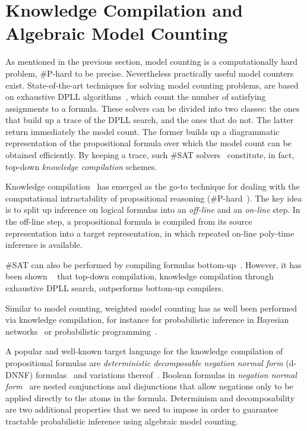 



\section{Knowledge Compilation and Algebraic Model Counting} \label{app:compilation}

As mentioned in the previous section, model counting is a computationally hard problem, \#P-hard to be precise. Nevertheless practically useful model counters exist. State-of-the-art techniques for solving model counting problems, are based on exhaustive DPLL algorithms~\citep{birnbaum1999good}, which count the number of satisfying assignments to a formula. These solvers can be divided into two classes: the ones that build up a trace of the DPLL search, and the ones that do not. The latter return immediately the model count. The former builds up a diagrammatic representation of the propositional formula over which the model count can be obtained efficiently. By keeping a trace, such \#SAT solvers~\citep{huang2005dpll,oztok2018exhaustive} constitute, in fact, top-down {\em knowledge compilation} schemes.

Knowledge compilation~\citep{darwiche2002knowledge} has emerged as the go-to technique for dealing with the computational intractability of propositional reasoning (\#P-hard~\citep{valiant1979complexity}). The key idea is to split up inference on logical formulas into an \textit{off-line} and an \textit{on-line} step. In the off-line step, a propositional formula is compiled from its source representation into a target representation, in which repeated on-line poly-time inference is available.

\#SAT can also be performed by compiling formulas bottom-up~\citep{choi2013dynamic}. However, it has been shown ~\citep{huang2005dpll,oztok2018exhaustive} that top-down compilation, \ie knowledge compilation through exhaustive DPLL search, outperforms bottom-up compilers.

Similar to model counting, weighted model counting has as well been performed via knowledge compilation, for instance for probabilistic inference in Bayesian networks~\citep{chavira2008probabilistic} or probabilistic programming~\citep{fierens2015inference}.


A popular and well-known target language for the knowledge compilation of propositional formulas are {\em deterministic decomposable negation normal
form} (d-DNNF) formulas~\citep{darwiche2001tractable}
and variations thereof~\citep{bryant1986graph,darwiche2011sdd}.
Boolean formulas in {\em negation normal form}~\citep{darwiche1999compiling} are nested conjunctions and disjunctions that allow negations only to be applied directly to the atoms in the formula.
Determinism and decomposability are two additional properties that we need to impose in order to guarantee tractable probabilistic inference using algebraic model counting.

